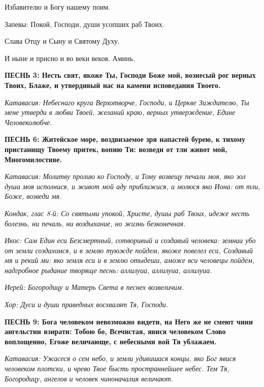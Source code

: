   Избавителю и Богу нашему поим.


   Запевы: Покой, Господи, души усопших раб Твоих.


   Слава Отцу и Сыну и Святому Духу.


   И ныне и присно и во веки веков. Аминь.


 

\bfseries ПЕСНЬ 3:\normalfont{}  Несть свят, якоже Ты, Господи Боже мой, вознесый
рог верных Твоих, Блаже, и утвердивый нас на камени исповедания
Твоего.


 \itshape Катавасия:\normalfont{} Небеснаго круга Верхотворче, Господи, и Церкве Зиждителю,
Ты мене утверди в любви Твоей, желаний краю, верных утверждение, Едине
Человеколюбче.



 

\bfseries ПЕСНЬ 6:\normalfont{}  Житейское море, воздвизаемое зря напастей бурею, к тихому
пристанищу Твоему притек, вопию Ти: возведи от тли живот мой,
Многомилостиве.


 \itshape Катавасия:\normalfont{} Молитву пролию ко Господу, и Тому возвещу печали моя, яко
зол душа моя исполнися, и живот мой аду приближися, и молюся яко Иона:
от тли, Боже, возведи мя.


 \itshape Кондак, глас 8-й:\normalfont{} Со святыми упокой, Христе, душы раб Твоих, идеже
несть болезнь, ни печаль, ни воздыхание, но жизнь безконечная.


 \itshape Икос:\normalfont{} Сам Един еси Безсмертный, сотворивый и создавый человека:
земнии убо от земли создахомся, и в землю туюжде пойдем, якоже повелел
еси, Создавый мя и рекий ми: яко земля еси и в землю отыдеши, аможе вси
человецы пойдем, надгробное рыдание творяще песнь: аллилуиа, аллилуиа,
аллилуиа.


 \itshape  Иерей:\normalfont{} Богородицу и Матерь Света в песнех возвеличим.


 \itshape  Хор:\normalfont{} Дуси и души праведных восхвалят Тя, Господи.


 

\bfseries ПЕСНЬ 9:\normalfont{}  Бога человеком невозможно видети, на Него же не смеют
чини ангельстии взирати: Тобою бо, Всечистая, явися человеком Слово
воплощенно, Егоже величающе, с небесными вой Тя ублажаем.


 \itshape Катавасия:\normalfont{} Ужасеся о сем небо, и земли удивишася концы, яко Бог явися
человеком плотски, и чрево Твое бысть пространнейшее небес. Тем Тя,
Богородицу, ангелов и человек чиноначалия величают.


